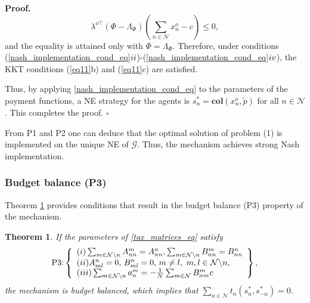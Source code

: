 \documentclass[twocolumn]{autart}
\newtheorem{theorem}{Theorem}
\newenvironment{proof}[1][Proof]{%
  \par\noindent\textbf{#1.}\ }{%
  \hfill$\square$\par
}
\begin{document}
\begin{proof}
\[\lambda^{o\top}(\Phi-\Lambda_\Phi)(\sum_{n\in\mathcal{N}}{x_n^o}-c)\le 0,\] and the equality is attained only with 
$\Phi = \Lambda_\Phi$. Therefore, under conditions (\ref{nash_implementation_cond_eq}$\romannumeral 2$)-(\ref{nash_implementation_cond_eq}$\romannumeral 4$), the KKT conditions (\ref{eq11}b) and (\ref{eq11}c) are satisfied. 

Thus, by applying  \eqref{nash_implementation_cond_eq} to the parameters of the payment functions, a NE strategy for the agents is $s_n^*=\textbf{col}(x_n^o, \tilde{p})$ for all $n\in\mathcal{N}$. This completes the proof.
\end{proof}
From P1 and P2 one can deduce that the optimal solution of problem (1) is implemented on the unique NE of $\mathcal G$. Thus, the mechanism achieves strong Nash implementation.
\subsubsection{Budget balance (P3)}
Theorem \ref{theorem3} provides conditions that result in the budget balance (P3) property of the mechanism.
\begin{theorem}\label{theorem3}
	If the parameters of \eqref{tax_matrices_eq} satisfy
	\begin{equation}\label{eq19}
		\textnormal{P3:} \left\{\begin{array}{l}
		 (\romannumeral 1) \sum_{m\in\mathcal{N}\backslash n}{A_{nn}^m}=A_{nn}^n, \sum_{m\in\mathcal{N}\backslash n}{B_{nn}^m}=B_{nn}^n\\
		 (\romannumeral 2) A_{ml}^n=0, \, B_{ml}^n=0, \, m\neq l, \ m,l\in \mathcal{N}\backslash n,\\
		 (\romannumeral 3) \sum_{m\in\mathcal{N}\backslash n}{a_n^m}=-\frac{1}{N}\sum_{m\in\mathcal{N}}{B_{nm}^m}c
		\end{array}\right\},
	\end{equation}
	the mechanism is budget balanced, which implies that $\sum_{n\in\mathcal{N}}{t_n(s_n^*, s_{-n}^*)}=0$.
\end{theorem}
\end{document}
